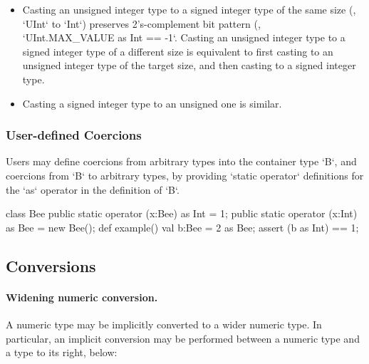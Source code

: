 \begin{itemize}
\item Casting an unsigned integer type to a signed integer type of the same
      size (\eg, \xcd`UInt` to \xcd`Int`) preserves 2's-complement bit pattern
      (\eg,  \\
      \xcd`UInt.MAX_VALUE as Int == -1`.   Casting an unsigned integer type to
      a signed integer type of a different size is equivalent to first casting
      to an unsigned integer type of the target size, and then casting to a
      signed integer type.

\item Casting a signed integer type to an unsigned one is similar.  

\end{itemize}

\subsubsection{User-defined Coercions}

Users may define coercions from arbitrary types into the container type
\xcd`B`, and coercions from \xcd`B` to arbitrary types, by providing
\xcd`static operator` definitions for the \xcd`as` operator in the definition of
\xcd`B`.  

\begin{ex}

\begin{xten}
class Bee {
  public static operator (x:Bee) as Int = 1;
  public static operator (x:Int) as Bee = new Bee();
  def example() {
    val b:Bee = 2 as Bee; 
    assert (b as Int) == 1;
  }
}
\end{xten}
%


\end{ex}



\subsection{Conversions}

\paragraph{Widening numeric conversion.}
\label{WideningConversions}
A numeric type may be implicitly converted to a wider numeric type. In
particular, an implicit conversion may be performed between a numeric
type and a type to its right, below:


